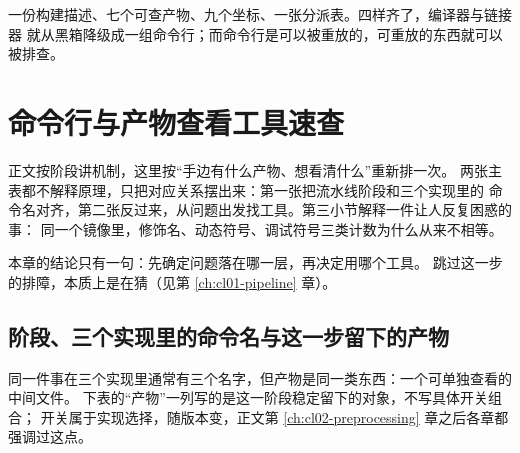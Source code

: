 \documentclass[12pt,a4paper,fontset=fandol]{ctexbook}
\begin{document}
\begin{guideline}[title={读完这一章应当带走的东西}]
一份构建描述、七个可查产物、九个坐标、一张分派表。四样齐了，编译器与链接器
就从黑箱降级成一组命令行；而命令行是可以被重放的，可重放的东西就可以被排查。
\end{guideline}

\appendix
\chapter{命令行与产物查看工具速查}\label{ap:clA-cli}

正文按阶段讲机制，这里按“手边有什么产物、想看清什么”重新排一次。
两张主表都不解释原理，只把对应关系摆出来：第一张把流水线阶段和三个实现里的
命令名对齐，第二张反过来，从问题出发找工具。第三小节解释一件让人反复困惑的事：
同一个镜像里，修饰名、动态符号、调试符号三类计数为什么从来不相等。

本章的结论只有一句：先确定问题落在哪一层，再决定用哪个工具。
跳过这一步的排障，本质上是在猜（见第 \ref{ch:cl01-pipeline} 章）。

\section{阶段、三个实现里的命令名与这一步留下的产物}

同一件事在三个实现里通常有三个名字，但产物是同一类东西：一个可单独查看的中间文件。
下表的“产物”一列写的是这一阶段稳定留下的对象，不写具体开关组合；
开关属于实现选择，随版本变，正文第 \ref{ch:cl02-preprocessing} 章之后各章都强调过这点。
\end{document}
